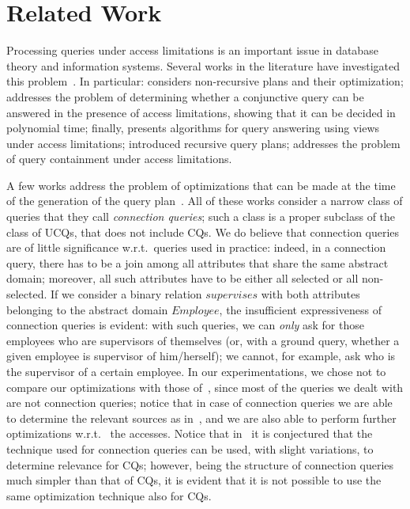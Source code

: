 \section{Related Work}
\label{sec:related}

Processing queries under access limitations is an important issue in database
theory and information systems.  Several works in the literature have
investigated this problem~\cite{RaSU95,DuLe97,FLMS99,MiLF00,LiCh00,LiCh01,LiCh01b,Li03,DBLP:journals/jcss/MillsteinHF03,NaLu04,LuNa04a,YaKC06,Srivastava:2006fk,Deutsch:2007lr}. In particular: \cite{FLMS99}
considers non-recursive plans and their optimization; \cite{RaSU95} addresses
the problem of determining whether a conjunctive query can be answered in the
presence of access limitations, showing that it can be decided in polynomial
time; finally, \cite{DuLe97} presents algorithms for query answering using
views under access limitations;
%
\cite{MiLF00,LiCh00} introduced recursive query
plans; \cite{MiLF00} addresses the problem of query containment
under access limitations.


A few works address the problem of optimizations that can be made at the time
of the generation of the query plan~\cite{LiCh00,LiCh01,LiCh01b}.  All of these
works consider a narrow class of queries that they call \emph{connection
  queries}; such a class is a proper subclass of the class of UCQs, that does
not include CQs.  We do believe that connection queries are of little
significance w.r.t.~queries used in practice: indeed, in a connection query,
there has to be a join among all attributes that share the same abstract
domain; moreover, all such attributes have to be either all selected or all
non-selected.  If we consider a binary relation $\mathit{supervises}$ with both
attributes belonging to the abstract domain $\mathit{Employee}$, the
insufficient expressiveness of connection queries is evident: with such
queries, we can \emph{only} ask for those employees who are supervisors of
themselves (or, with a ground query, whether a given employee is supervisor of
him/herself); we cannot, for example, ask who is the supervisor of a certain
employee.  In our experimentations, we chose not to compare our optimizations
with those of~\cite{LiCh01b}, since most of the queries we dealt with are not
connection queries; notice that in case of connection queries we are able to
determine the relevant sources as in~\cite{LiCh01b}, and we are also able to
perform further optimizations w.r.t.~ the accesses.  Notice that
in~\cite{LiCh01b} it is conjectured that the technique used for connection
queries can be used, with slight variations, to determine relevance for CQs;
however, being the structure of connection queries much simpler than that of
CQs, it is evident that it is not possible to use the same optimization
technique also for CQs.

